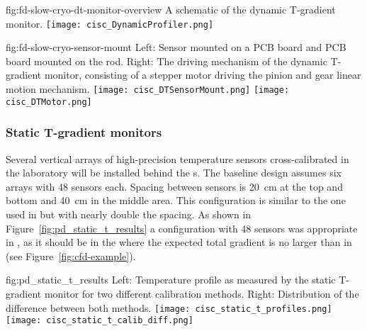 \begin{dunefigure}{fig:fd-slow-cryo-dt-monitor-overview}
  {%
  A schematic of the dynamic T-gradient monitor.}
 \texttt{[image: cisc\_DynamicProfiler.png]}
\end{dunefigure}
\begin{dunefigure}{fig:fd-slow-cryo-sensor-mount}
  {Left: Sensor mounted on a PCB board and PCB board mounted on the rod. Right:
    The driving mechanism of the dynamic T-gradient monitor, consisting of a stepper motor driving the pinion and gear linear motion mechanism. }
  \texttt{[image: cisc\_DTSensorMount.png]}
  \hspace{3cm}%
  \texttt{[image: cisc\_DTMotor.png]}
\end{dunefigure}


\subsubsection{Static T-gradient monitors}
\label{sec:fdgen-slow-cryo-static-therm}

Several vertical arrays of high-precision temperature sensors cross-calibrated in the laboratory will be installed behind the s.  
The baseline design assumes six arrays with \num{48} sensors each. Spacing between sensors
is \SI{20}{cm} at the top and bottom and \SI{40}{cm} in the middle area. This configuration is similar to the one used in  but with nearly double the spacing. 
As shown in Figure~\ref{fig:pd_static_t_results} a configuration with \num{48} sensors was appropriate in , as it should be in the  where the expected total gradient is no larger than in  (see Figure~\ref{fig:cfd-example}). 

\begin{dunefigure}{fig:pd_static_t_results}{
 Left: Temperature profile as measured by the static T-gradient monitor for two different calibration methods. Right: Distribution of the difference between both methods.}
  \texttt{[image: cisc\_static\_t\_profiles.png]}%
  \texttt{[image: cisc\_static\_t\_calib\_diff.png]}%
\end{dunefigure}

